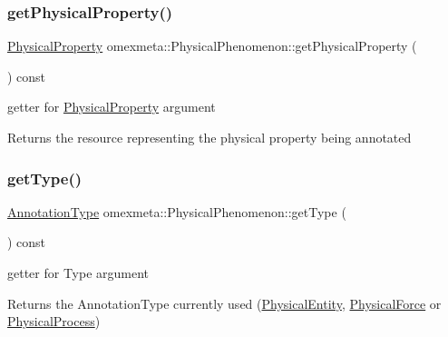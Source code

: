 \subsubsection{\texorpdfstring{get\+Physical\+Property()}{getPhysicalProperty()}}
{\footnotesize\ttfamily \hyperlink{classomexmeta_1_1PhysicalProperty}{Physical\+Property} omexmeta\+::\+Physical\+Phenomenon\+::get\+Physical\+Property (\begin{DoxyParamCaption}{ }\end{DoxyParamCaption}) const}



getter for \hyperlink{classomexmeta_1_1PhysicalProperty}{Physical\+Property} argument 

\begin{DoxyReturn}{Returns}
the resource representing the physical property being annotated 
\end{DoxyReturn}
\mbox{\label{classomexmeta_1_1PhysicalPhenomenon_a9676a1dcc458247a19d19cda16d640f4}} 
\subsubsection{\texorpdfstring{get\+Type()}{getType()}}
{\footnotesize\ttfamily \hyperlink{namespaceomexmeta_a1129ebb8a92218ebb27b9c76ac8462f7}{Annotation\+Type} omexmeta\+::\+Physical\+Phenomenon\+::get\+Type (\begin{DoxyParamCaption}{ }\end{DoxyParamCaption}) const}



getter for Type argument 

\begin{DoxyReturn}{Returns}
the Annotation\+Type currently used (\hyperlink{classomexmeta_1_1PhysicalEntity}{Physical\+Entity}, \hyperlink{classomexmeta_1_1PhysicalForce}{Physical\+Force} or \hyperlink{classomexmeta_1_1PhysicalProcess}{Physical\+Process}) 
\end{DoxyReturn}
\mbox{\label{classomexmeta_1_1PhysicalPhenomenon_aa09896afed6124d042d7d8f82b21cae9}} 
